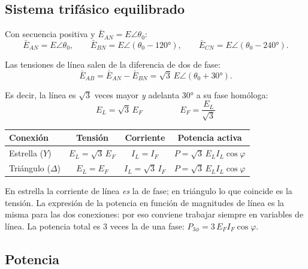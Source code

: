 \documentclass[11pt,a4paper]{article}
\begin{document}
\subsection{Sistema trifásico equilibrado}

Con secuencia positiva y $\bar{E}_{AN} = E\angle\theta_0$:
\begin{equation}
  \bar{E}_{AN} = E\angle\theta_0, \qquad
  \bar{E}_{BN} = E\angle(\theta_0 - \ang{120}), \qquad
  \bar{E}_{CN} = E\angle(\theta_0 - \ang{240}) .
\end{equation}

Las tensiones de línea salen de la diferencia de dos de fase:
\begin{equation}
  \bar{E}_{AB} = \bar{E}_{AN} - \bar{E}_{BN} = \sqrt{3}\,E \angle(\theta_0 + \ang{30}) .
\end{equation}

\noindent Es decir, la línea es $\sqrt{3}$ veces mayor \emph{y} adelanta \ang{30} a su fase homóloga:
\begin{equation}
  \boxed{\ E_L = \sqrt{3}\,E_F \ }
  \qquad\qquad
  \boxed{\ E_F = \frac{E_L}{\sqrt{3}} \ }
\end{equation}

\begin{table}[h]
\centering
\begin{tabular}{@{}lccc@{}}
\toprule
\textbf{Conexión} & \textbf{Tensión} & \textbf{Corriente} & \textbf{Potencia activa} \\
\midrule
Estrella ($Y$)     & $E_L = \sqrt{3}\,E_F$ & $I_L = I_F$            & $P = \sqrt{3}\,E_L I_L\cos\varphi$ \\
Triángulo ($\Delta$) & $E_L = E_F$          & $I_L = \sqrt{3}\,I_F$ & $P = \sqrt{3}\,E_L I_L\cos\varphi$ \\
\bottomrule
\end{tabular}
\end{table}

\noindent En estrella la corriente de línea \emph{es} la de fase; en triángulo lo que coincide
es la tensión. La expresión de la potencia en función de magnitudes de línea es la misma
para las dos conexiones: por eso conviene trabajar siempre en variables de línea.
La potencia total es $3$ veces la de una fase: $P_{3\phi} = 3\,E_F I_F \cos\varphi$.

\subsection{Potencia}
\end{document}
